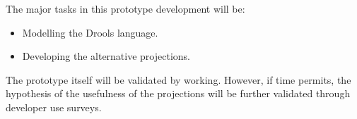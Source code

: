 The major tasks in this prototype development will be: 
\begin{itemize}
    \item Modelling the Drools language.
    \item Developing the alternative projections.
\end{itemize}

The prototype itself will be validated by working.
However, if time permits, the hypothesis of the usefulness of the projections will be further validated through developer use surveys.

